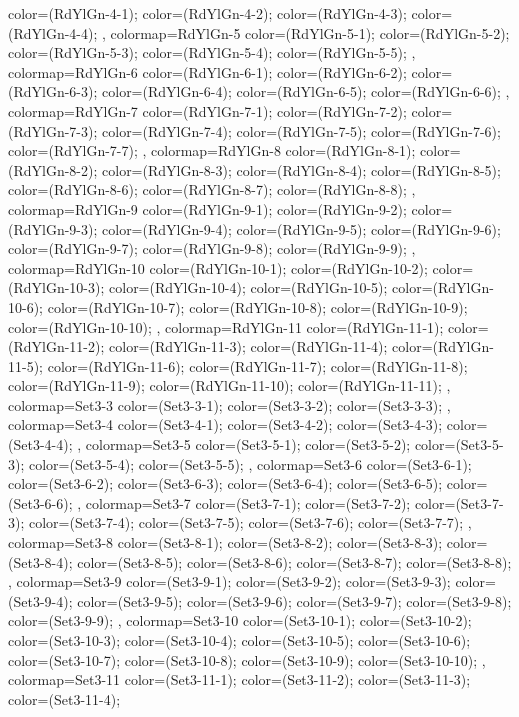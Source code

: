 {{color=(RdYlGn-4-1);
color=(RdYlGn-4-2);
color=(RdYlGn-4-3);
color=(RdYlGn-4-4);
},
colormap={RdYlGn-5}{
color=(RdYlGn-5-1);
color=(RdYlGn-5-2);
color=(RdYlGn-5-3);
color=(RdYlGn-5-4);
color=(RdYlGn-5-5);
},
colormap={RdYlGn-6}{
color=(RdYlGn-6-1);
color=(RdYlGn-6-2);
color=(RdYlGn-6-3);
color=(RdYlGn-6-4);
color=(RdYlGn-6-5);
color=(RdYlGn-6-6);
},
colormap={RdYlGn-7}{
color=(RdYlGn-7-1);
color=(RdYlGn-7-2);
color=(RdYlGn-7-3);
color=(RdYlGn-7-4);
color=(RdYlGn-7-5);
color=(RdYlGn-7-6);
color=(RdYlGn-7-7);
},
colormap={RdYlGn-8}{
color=(RdYlGn-8-1);
color=(RdYlGn-8-2);
color=(RdYlGn-8-3);
color=(RdYlGn-8-4);
color=(RdYlGn-8-5);
color=(RdYlGn-8-6);
color=(RdYlGn-8-7);
color=(RdYlGn-8-8);
},
colormap={RdYlGn-9}{
color=(RdYlGn-9-1);
color=(RdYlGn-9-2);
color=(RdYlGn-9-3);
color=(RdYlGn-9-4);
color=(RdYlGn-9-5);
color=(RdYlGn-9-6);
color=(RdYlGn-9-7);
color=(RdYlGn-9-8);
color=(RdYlGn-9-9);
},
colormap={RdYlGn-10}{
color=(RdYlGn-10-1);
color=(RdYlGn-10-2);
color=(RdYlGn-10-3);
color=(RdYlGn-10-4);
color=(RdYlGn-10-5);
color=(RdYlGn-10-6);
color=(RdYlGn-10-7);
color=(RdYlGn-10-8);
color=(RdYlGn-10-9);
color=(RdYlGn-10-10);
},
colormap={RdYlGn-11}{
color=(RdYlGn-11-1);
color=(RdYlGn-11-2);
color=(RdYlGn-11-3);
color=(RdYlGn-11-4);
color=(RdYlGn-11-5);
color=(RdYlGn-11-6);
color=(RdYlGn-11-7);
color=(RdYlGn-11-8);
color=(RdYlGn-11-9);
color=(RdYlGn-11-10);
color=(RdYlGn-11-11);
},
colormap={Set3-3}{
color=(Set3-3-1);
color=(Set3-3-2);
color=(Set3-3-3);
},
colormap={Set3-4}{
color=(Set3-4-1);
color=(Set3-4-2);
color=(Set3-4-3);
color=(Set3-4-4);
},
colormap={Set3-5}{
color=(Set3-5-1);
color=(Set3-5-2);
color=(Set3-5-3);
color=(Set3-5-4);
color=(Set3-5-5);
},
colormap={Set3-6}{
color=(Set3-6-1);
color=(Set3-6-2);
color=(Set3-6-3);
color=(Set3-6-4);
color=(Set3-6-5);
color=(Set3-6-6);
},
colormap={Set3-7}{
color=(Set3-7-1);
color=(Set3-7-2);
color=(Set3-7-3);
color=(Set3-7-4);
color=(Set3-7-5);
color=(Set3-7-6);
color=(Set3-7-7);
},
colormap={Set3-8}{
color=(Set3-8-1);
color=(Set3-8-2);
color=(Set3-8-3);
color=(Set3-8-4);
color=(Set3-8-5);
color=(Set3-8-6);
color=(Set3-8-7);
color=(Set3-8-8);
},
colormap={Set3-9}{
color=(Set3-9-1);
color=(Set3-9-2);
color=(Set3-9-3);
color=(Set3-9-4);
color=(Set3-9-5);
color=(Set3-9-6);
color=(Set3-9-7);
color=(Set3-9-8);
color=(Set3-9-9);
},
colormap={Set3-10}{
color=(Set3-10-1);
color=(Set3-10-2);
color=(Set3-10-3);
color=(Set3-10-4);
color=(Set3-10-5);
color=(Set3-10-6);
color=(Set3-10-7);
color=(Set3-10-8);
color=(Set3-10-9);
color=(Set3-10-10);
},
colormap={Set3-11}{
color=(Set3-11-1);
color=(Set3-11-2);
color=(Set3-11-3);
color=(Set3-11-4);
}}
